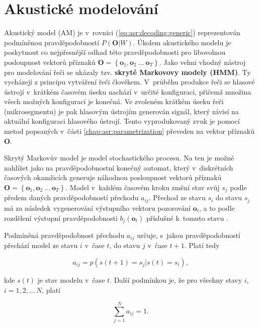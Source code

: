 \section{Akustické modelování}
\label{chap:asr:acoustic}

Akustický model (AM) je v~rovnici (\ref{eq:asr:decoding:generic}) reprezentován podmíněnou pravděpodobností $P(\boldsymbol{O}|W)$. Úkolem akustického modelu je poskytnout co nejpřesnější odhad této pravděpodobnosti pro libovolnou posloupnost vektorů příznaků $\boldsymbol{O} = \left\{\boldsymbol{o}_1, \boldsymbol{o}_2\ \dots\ \boldsymbol{o}_T\right\}$. Jako velmi vhodný nástroj pro modelování řeči se ukázaly tzv. \textbf{skryté Markovovy modely (HMM)}. Ty vycházejí z principu vytváření řeči člověkem. V~průběhu produkce řeči se hlasové ústrojí v~krátkém časovém úseku nachází v~určité konfiguraci, přičemž množina všech možných konfigurací je konečná. Ve zvoleném krátkém úseku řeči (mikrosegmentu) je pak hlasovým ústrojím generován signál, který závisí na aktuální konfiguraci hlasového ústrojí. Tento vyprodukovaný zvuk je pomocí metod popsaných v~části \ref{chap:asr:parametrization} převeden na vektor příznaků $\boldsymbol{O}$.

Skrytý Markovův model je model stochastického procesu. Na ten je možné nahlížet jako na pravděpodobnostní konečný automat, který v~diskrétních časových okamžicích generuje náhodnou posloupnost vektorů příznaků $\boldsymbol{O} = \left\{\boldsymbol{o}_1, \boldsymbol{o}_2\ \dots\ \boldsymbol{o}_T\right\}$. Model v~každém časovém kroku změní stav svůj $s_j$ podle předem daných pravděpodobností přechodu $a_{ij}$. Přechod ze stavu $s_i$ do stavu $s_j$ má za následek vygenerování výstupního vektoru pozorování $\boldsymbol{o}_t$, a to podle rozdělení výstupní pravděpodobnosti $b_j\left(\boldsymbol{o}_t\right)$ příslušné  k~tomuto stavu \cite{Psutka2006}.

Podmíněná pravděpodobnost přechodu $a_{ij}$ určuje, s~jakou pravděpodobností přechází model ze stavu $i$ v~čase $t$, do stavu $j$ v~čase $t+1$. Platí tedy

\begin{equation}
  a_{ij} = p\left(s\left(t+1\right)=s_j|s\left(t\right)=s_i\right),
  \label{eq:asr:acoustic:conditional}
\end{equation}

\noindent kde $s\left(t\right)$ je stav modelu v~čase $t$. Další podmínkou je, že pro všechny stavy $i$, $i=1,2,\dots\,N$, platí

\begin{equation}
  \sum_{j=1}^{N} a_{ij} = 1.
  \label{eq:asr:acoustic:state:condition}
\end{equation}

